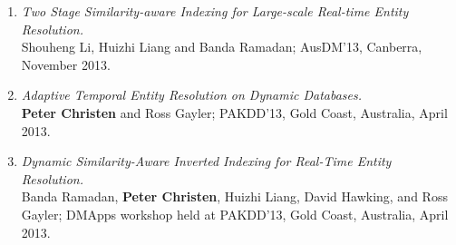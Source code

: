 \documentclass[a4paper,oneside,12pt]{article}
\begin{document}
\begin{enumerate}
\item {\em Two Stage Similarity-aware Indexing for Large-scale
      Real-time Entity Resolution.} \\
      Shouheng Li, Huizhi Liang and Banda Ramadan; AusDM'13,
      Canberra, November 2013.
\item {\em Adaptive Temporal Entity Resolution on Dynamic
      Databases.} \\
      \textbf{Peter Christen} and Ross Gayler; PAKDD'13,
      Gold Coast, Australia, April 2013.
\item {\em Dynamic Similarity-Aware Inverted Indexing for Real-Time
      Entity Resolution.} \\
      Banda Ramadan, \textbf{Peter Christen}, Huizhi Liang,
      David Hawking, and Ross Gayler; DMApps workshop held at
      PAKDD'13, Gold Coast, Australia, April 2013.
\end{enumerate}

\end{document}

